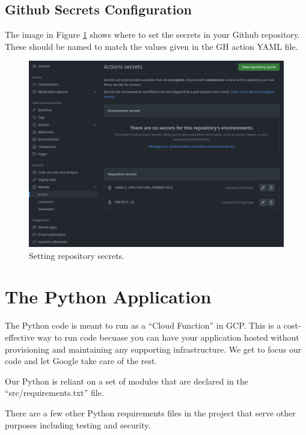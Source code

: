 \subsection{\label{sec:gh_secrets}Github Secrets Configuration}

\justifying
The image in Figure \ref{gh_secrets} shows where to set the secrets in your Github repository. These should be named to match the values given in the GH action YAML file.
\vspace{2mm}

\begin{figure}[ht]
	\includegraphics[width=12cm]{images/gh_secrets.png}
	\caption{Setting repository secrets.}
	\label{gh_secrets}
\end{figure}
\vspace{2mm}

\section{\label{sec:Python} The Python Application}

\justifying
The Python code is meant to run as a ``Cloud Function'' in GCP. This is a cost-effective way to run code becuase you can have
your application hosted without provisioning and maintaining any supporting infrastructure. We get to focus our code and let Google
take care of the rest.

\justifying
Our Python is reliant on a set of modules that are declared in the ``src/requirements.txt'' file.


\justifying
There are a few other Python requirements files in the project that serve other purposes including testing and security.


